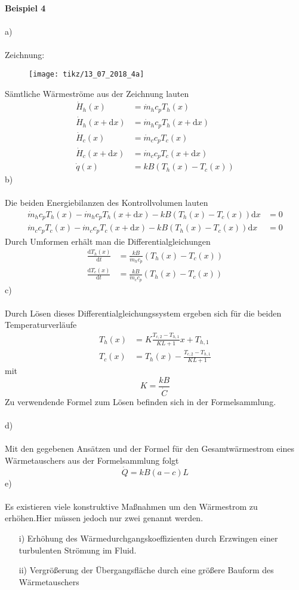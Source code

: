 \textbf{Beispiel 4}\\ \\
a)\\ \\
Zeichnung:
\begin{figure}[h]
	\centering
	\texttt{[image: tikz/13\_07\_2018\_4a]}
\end{figure}
\newline
Sämtliche Wärmeströme aus der Zeichnung lauten
\begin{align*}
	\dot{H}_h(x) &= \dot{m}_hc_pT_h(x) \\
	\dot{H}_h(x + \text{d}x) &= \dot{m}_hc_pT_h(x + \text{d}x) \\
	\dot{H}_c(x) &= \dot{m}_cc_pT_c(x) \\
	\dot{H}_c(x + \text{d}x) &= \dot{m}_cc_pT_c(x + \text{d}x) \\
	\dot{q}(x) &= kB(T_h(x) - T_c(x))
\end{align*}
b)\\ \\
Die beiden Energiebilanzen des Kontrollvolumen lauten
\begin{align*}
	\dot{m}_hc_pT_h(x) - \dot{m}_hc_pT_h(x + \text{d}x) - kB(T_h(x) - T_c(x))\text{d}x &= 0 \\
	\dot{m}_cc_pT_c(x) - \dot{m}_cc_pT_c(x + \text{d}x) - kB(T_h(x) - T_c(x))\text{d}x &= 0
\end{align*}
Durch Umformen erhält man die Differentialgleichungen
\begin{align*}
	\frac{\text{d}T_h(x)}{\text{d}t} &= \frac{kB}{\dot{m}_hc_p}\left(T_h(x) - T_c(x)\right) \\
	\frac{\text{d}T_c(x)}{\text{d}t} &= \frac{kB}{\dot{m}_cc_p}\left(T_h(x) - T_c(x)\right)
\end{align*}
c)\\ \\
Durch Lösen dieses Differentialgleichungssystem ergeben sich für die beiden Temperaturverläufe
\begin{align*}
	T_h(x) &= K \frac{T_{c,2} - T_{h,1}}{KL + 1}x + T_{h,1} \\
	T_c(x) &= T_h(x) - \frac{T_{c,2} - T_{h,1}}{KL + 1}
\end{align*}
mit
\[
	K = \frac{kB}{\dot{C}}
\]
Zu verwendende Formel zum Lösen befinden sich in der Formelsammlung. \\ \\
d)\\ \\
Mit den gegebenen Ansätzen und der Formel für den Gesamtwärmestrom eines Wärmetauschers aus der Formelsammlung folgt
\[
	\dot{Q} = kB(a - c)L
\]
e)\\ \\
Es existieren viele konstruktive Maßnahmen um den Wärmestrom zu erhöhen.Hier müssen jedoch nur zwei genannt werden.
\begin{enumerate}
	\item[i)] Erhöhung des Wärmedurchgangskoeffizienten durch Erzwingen einer turbulenten Strömung im Fluid.
	\item[ii)] Vergrößerung der Übergangsfläche durch eine größere Bauform des Wärmetauschers
\end{enumerate}